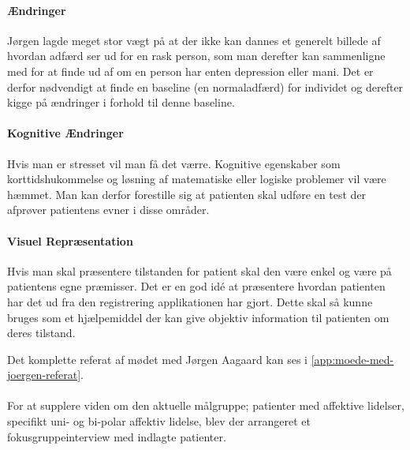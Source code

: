 \paragraph{Ændringer}
Jørgen lagde meget stor vægt på at der ikke kan dannes et generelt billede af hvordan adfærd ser ud for en rask person, som man derefter kan sammenligne med for at finde ud af om en person har enten depression eller mani.
Det er derfor nødvendigt at finde en baseline (en normaladfærd) for individet og derefter kigge på ændringer i forhold til denne baseline.

\paragraph{Kognitive Ændringer}
Hvis man er stresset vil man få det værre. 
Kognitive egenskaber som korttidshukommelse og løsning af matematiske eller logiske problemer vil være hæmmet.
Man kan derfor forestille sig at patienten skal udføre en test der afprøver patientens evner i disse områder.

\paragraph{Visuel Repræsentation}
Hvis man skal præsentere tilstanden for patient skal den være enkel og være på patientens egne præmisser. Det er en god idé at præsentere hvordan patienten har det ud fra den registrering applikationen har gjort. Dette skal så kunne bruges som et hjælpemiddel der kan give objektiv information til patienten om deres tilstand.

Det komplette referat af mødet med Jørgen Aagaard kan ses i \cref{app:moede-med-joergen-referat}.

\paragraph{}
For at supplere viden om den aktuelle målgruppe; patienter med affektive lidelser, specifikt uni- og bi-polar affektiv lidelse, blev der arrangeret et fokusgruppeinterview med indlagte patienter.

